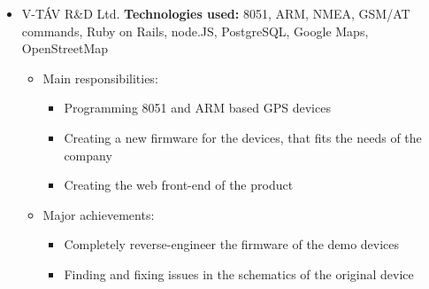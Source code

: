 \documentclass[10pt,a4paper,roman]{moderncv}
\newcommand{\taglist}[1]{{\tiny \textbf{Technologies used:} #1}}
\begin{document}
{\begin{itemize}
\begin{itemize}
\begin{itemize}
\item Creating reports based on user supplied data
\item Creating and administering sister-sites
\item Keeping the business logic up-to-date with the constant changing need of the insurance companies
\item Keeping the always-changing interfaces with the insurance companies' web/services up-to-date
\end{itemize}
\item Major achievements:
\begin{itemize}
\item Designed and built the complete frontend site from ground up in only a few months
\item Designed and built a DSL to easily manage the specific quote formulas of the insurance companies
\end{itemize}
\end{itemize}
\item V-TÁV R\&D Ltd. \hfill\break
\taglist{8051, ARM, NMEA, GSM/AT commands, Ruby on Rails, node.JS, PostgreSQL, Google Maps, OpenStreetMap}
\begin{itemize}
\item Main responsibilities:
\begin{itemize}
\item Programming 8051 and ARM based GPS devices
\item Creating a new firmware for the devices, that fits the needs of the company
\item Creating the web front-end of the product
\end{itemize}
\item Major achievements:
\begin{itemize}
\item Completely reverse-engineer the firmware of the demo devices
\item Finding and fixing issues in the schematics of the original device
\end{itemize}
\end{itemize}
\end{itemize}
}
\end{document}
